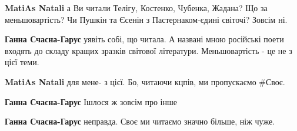 \begin{itemize}
 
\textbf{MatiAs Natali} а Ви читали Телігу, Костенко, Чубенка, Жадана?
Що за меньшовартість?
Чи Пушкін та Єсенін з Пастернаком-єдині світочі?
Зовсім ні.

\begin{itemize}
 
\textbf{Ганна Счасна-Гарус} уявіть собі, що читала. А названі мною російські поети входять до складу кращих зразків світової літератури. Меньшовартість - це не з цієї теми.

 
\textbf{MatiAs Natali} для мене- з цієї.
Бо, читаючи кцпів, ми пропускаємо \#Своє.

 
\textbf{Ганна Счасна-Гарус}
Ішлося ж зовсім про інше

 
\textbf{Ганна Счасна-Гарус} неправда. Своє ми читаємо значно більше, ніж чуже.

 


\end{itemize}
\end{itemize}
